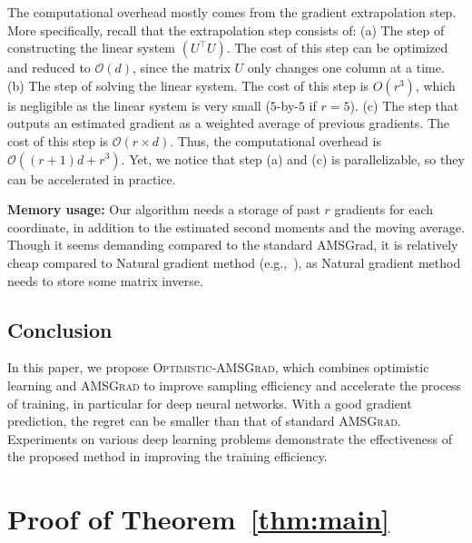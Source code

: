 \documentclass[11pt]{article}
\theoremstyle{k}
\begin{document}
The computational overhead mostly comes from the gradient extrapolation step. More specifically, recall that the extrapolation step consists of:
(a) The step of constructing the linear system $(U^\top U)$.
The cost of this step can be optimized and reduced to $\mathcal O(d)$, since the matrix $U$ only changes one column at a time.
(b) The step of solving the linear system.
The cost of this step is $O(r^3)$, which is negligible as the linear system is very small ($5$-by-$5$ if $r=5$).
(c) The step that outputs an estimated gradient as a weighted average of previous gradients.
The cost of this step is $\mathcal O(r \times d)$. Thus, the computational overhead is $\mathcal O\left((r+1)d+r^3\right)$.
Yet, we notice that step (a) and (c) is parallelizable, so they can be accelerated in practice.

\noindent \textbf{Memory usage:} Our algorithm needs a storage of past $r$ gradients for each coordinate, in addition to the estimated second moments and the moving average. Though it seems demanding compared to the standard AMSGrad, it is relatively cheap compared to Natural gradient method (e.g.,~\cite{MG15}), as Natural gradient method needs to store some matrix inverse.

\subsection{Conclusion}
In this paper, we propose \textsc{Optimistic-AMSGrad}, which combines optimistic learning and \textsc{AMSGrad} to improve sampling efficiency and
accelerate the process of training, in particular for deep neural networks. With a good gradient prediction, the regret can be smaller than that of standard \textsc{AMSGrad}. Experiments on various deep learning problems demonstrate the effectiveness of the proposed method in improving the training efficiency. 




\clearpage

\appendix

\section{Proof of Theorem~\ref{thm:main}} \label{app:thm}
\end{document}
